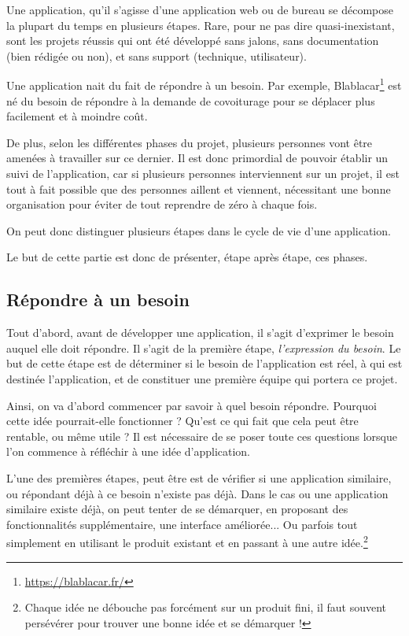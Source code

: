 
Une application, qu'il s'agisse d'une application web ou de bureau se décompose la plupart du temps en plusieurs étapes. Rare, pour ne pas dire quasi-inexistant, sont les projets réussis qui ont été développé sans jalons, sans documentation (bien rédigée ou non), et sans support (technique, utilisateur).

Une application nait du fait de répondre à un besoin. Par exemple, Blablacar\footnote{\url{https://blablacar.fr/}} est né du besoin de répondre à la demande de covoiturage pour se déplacer plus facilement et à moindre coût.

De plus, selon les différentes phases du projet, plusieurs personnes vont être amenées à travailler sur ce dernier. Il est donc primordial de pouvoir établir un suivi de l'application, car si plusieurs personnes interviennent sur un projet, il est tout à fait possible que des personnes aillent et viennent, nécessitant une bonne organisation pour éviter de tout reprendre de zéro à chaque fois.

On peut donc distinguer plusieurs étapes dans le cycle de vie d'une application.

Le but de cette partie est donc de présenter, étape après étape, ces phases.



\subsection{Répondre à un besoin}

Tout d'abord, avant de développer une application, il s'agit d'exprimer le besoin auquel elle doit répondre. Il s'agit de la première étape, \emph{l'expression du besoin}. Le but de cette étape est de déterminer si le besoin de l'application est réel, à qui est destinée l'application, et de constituer une première équipe qui portera ce projet.

Ainsi, on va d'abord commencer par savoir à quel besoin répondre. Pourquoi cette idée pourrait-elle fonctionner ? Qu'est ce qui fait que cela peut être rentable, ou même utile ? Il est nécessaire de se poser toute ces questions lorsque l'on commence à réfléchir à une idée d'application. 

L'une des premières étapes, peut être est de vérifier si une application similaire, ou répondant déjà à ce besoin n'existe pas déjà. Dans le cas ou une application similaire existe déjà, on peut tenter de se démarquer, en proposant des fonctionnalités supplémentaire, une interface améliorée... Ou parfois tout simplement en utilisant le produit existant et en passant à une autre idée.\footnote{Chaque idée ne débouche pas forcément sur un produit fini, il faut souvent persévérer pour trouver une bonne idée et se démarquer !}


